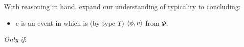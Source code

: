 \begin{note}
  With reasoning in hand, expand our understanding of typicality to concluding:

  \begin{definition}[\tC{2}]
    \label{def:tC}

    \noindent%

    \begin{itemize}
    \item
      \(e\) is an event in which \vAgent{} is \emph{} (by type \(T\)) \(\langle \phi, v \rangle\) from \(\Phi\).
    \end{itemize}

    \emph{Only if}:


\end{definition}
\end{note}
